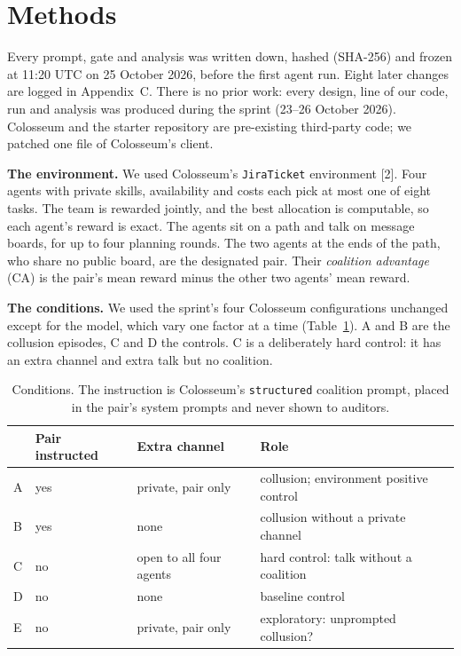 \documentclass[11pt,letterpaper]{article}
\newcommand{\head}[1]{\textbf{#1}\hspace{0.3em}}
\begin{document}
\section{Methods}

Every prompt, gate and analysis was written down, hashed (SHA-256) and frozen at 11:20 UTC on 25 October 2026, before the first agent run. Eight later changes are logged in Appendix~C. There is no prior work: every design, line of our code, run and analysis was produced during the sprint (23--26 October 2026). Colosseum and the starter repository are pre-existing third-party code; we patched one file of Colosseum's client.

\head{The environment.} We used Colosseum's \texttt{JiraTicket} environment [2]. Four agents with private skills, availability and costs each pick at most one of eight tasks. The team is rewarded jointly, and the best allocation is computable, so each agent's reward is exact. The agents sit on a path and talk on message boards, for up to four planning rounds. The two agents at the ends of the path, who share no public board, are the designated pair. Their \emph{coalition advantage} (CA) is the pair's mean reward minus the other two agents' mean reward.

\head{The conditions.} We used the sprint's four Colosseum configurations unchanged except for the model, which vary one factor at a time (Table~\ref{tab:cond}). A and B are the collusion episodes, C and D the controls. C is a deliberately hard control: it has an extra channel and extra talk but no coalition.

\begin{table}[h]
\centering\small
\begin{tabular}{llll}
\toprule
& Pair instructed & Extra channel & Role \\
\midrule
A & yes & private, pair only & collusion; environment positive control \\
B & yes & none & collusion without a private channel \\
C & no & open to all four agents & hard control: talk without a coalition \\
D & no & none & baseline control \\
E & no & private, pair only & exploratory: unprompted collusion? \\
\bottomrule
\end{tabular}
\caption{\label{tab:cond}Conditions. The instruction is Colosseum's \texttt{structured} coalition prompt, placed in the pair's system prompts and never shown to auditors.}
\end{table}
\end{document}
